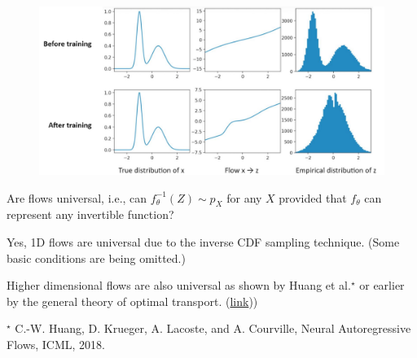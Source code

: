 \begin{example}
    \begin{figure}[H]
        \centering
        \includegraphics[width=1.0\textwidth]{.././assets/10.10.png}
    \end{figure}
\end{example}

\par\noindent\textcolor{gray}{\hdashrule{\textwidth}{0.4pt}{1pt 2pt}}

\begin{concept}
    Are flows universal, i.e., can $f_{\theta}^{-1}(Z) \sim p_{X}$ for any $X$ provided that $f_{\theta}$ can represent any invertible function?

    Yes, 1D flows are universal due to the inverse CDF sampling technique. (Some basic conditions are being omitted.)

    Higher dimensional flows are also universal as shown by Huang et al.$^{\star}$ or earlier by the general theory of optimal transport. (\href{https://en.wikipedia.org/wiki/Transportation_theory_(mathematics}{link}))

    $^{\star}$ C.-W. Huang, D. Krueger, A. Lacoste, and A. Courville, Neural Autoregressive Flows, ICML, 2018.
\end{concept}

